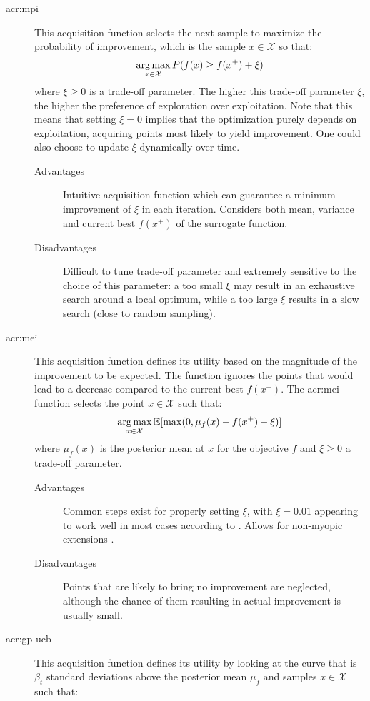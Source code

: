 \begin{description}
	\item[\acrfull{acr:mpi}] This acquisition function selects the next sample to maximize the probability of improvement, which is the sample $x \in \mathcal{X}$ so that:
	$$\operatorname*{arg\,max}_{x \in \mathcal{X}} P(f(x) \geq f(x^+) + \xi)$$
	where $\xi \geq 0$ is a trade-off parameter. The higher this trade-off parameter $\xi$, the higher the preference of exploration over exploitation. Note that this means that setting $\xi = 0$ implies that the optimization purely depends on exploitation, acquiring points most likely to yield improvement. One could also choose to update $\xi$ dynamically over time.
	\begin{description}
		\item[Advantages] Intuitive acquisition function which can guarantee a minimum improvement of $\xi$ in each iteration. Considers both mean, variance and current best $f(x^+)$ of the surrogate function.
		\item[Disadvantages] Difficult to tune trade-off parameter and extremely sensitive to the choice of this parameter: a too small $\xi$ may result in an exhaustive search around a local optimum, while a too large $\xi$ results in a slow search (close to random sampling).
	\end{description}
	\item[\acrfull{acr:mei}] This acquisition function defines its utility based on the magnitude of the improvement to be expected. The function ignores the points that would lead to a decrease compared to the current best $f(x^+)$. The \acrshort{acr:mei} function selects the point $x \in \mathcal{X}$ such that:
	$$\operatorname*{arg\,max}_{x \in \mathcal{X}} \mathbb{E}[\max(0, \mu_f(x) - f(x^+) - \xi)]$$
	where $\mu_f(x)$ is the posterior mean at $x$ for the objective $f$ and $\xi \geq 0$ a trade-off parameter.
	\begin{description}
		\item[Advantages] Common steps exist for properly setting $\xi$, with $\xi = 0.01$ appearing to work well in most cases according to \cite{lizotte2008practical}. Allows for non-myopic extensions \cite{Brochu2010}.
		\item[Disadvantages] Points that are likely to bring no improvement are neglected, although the chance of them resulting in actual improvement is usually small.
	\end{description}
	\item[\acrfull{acr:gp-ucb}] This acquisition function defines its utility by looking at the curve that is $\beta_t$ standard deviations above the posterior mean $\mu_f$ and samples $x \in \mathcal{X}$ such that:

\end{description}
